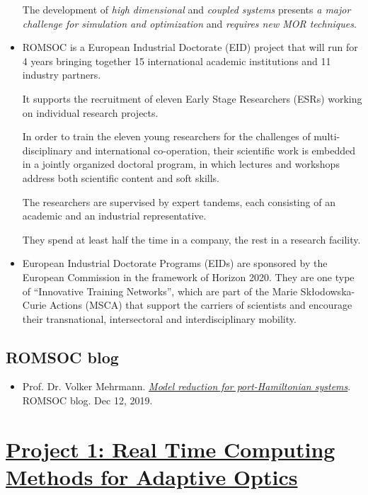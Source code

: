 \documentclass{book}
\numberwithin{equation}{section}
\begin{document}
\begin{itemize}
    The development of \textit{high dimensional} and \textit{coupled systems} presents \textit{a major challenge for simulation and optimization} and \textit{requires new MOR techniques}.
    \item ROMSOC is a European Industrial Doctorate (EID) project that will run for 4 years bringing together 15 international academic institutions and 11 industry partners.
    
    It supports the recruitment of eleven Early Stage Researchers (ESRs) working on individual research projects.
    
    In order to train the eleven young researchers for the challenges of multi-disciplinary and international co-operation, their scientific work is embedded in a jointly organized doctoral program, in which lectures and workshops address both scientific content and soft skills.
    
    The researchers are supervised by expert tandems, each consisting of an academic and an industrial representative.
    
    They spend at least half the time in a company, the rest in a research facility.
    \item European Industrial Doctorate Programs (EIDs) are sponsored by the European Commission in the framework of Horizon 2020. They are one type of ``Innovative Training Networks'', which are part of the Marie Skłodowska-Curie Actions (MSCA) that support the carriers of scientists and encourage their transnational, intersectoral and interdisciplinary mobility.
\end{itemize}

\section*{ROMSOC blog}
\begin{itemize}
    \item Prof. Dr. Volker Mehrmann. \href{https://www.romsoc.eu/model-reduction-for-port-hamiltonian-systems/}{\textit{Model reduction for port-Hamiltonian systems}}. ROMSOC blog. Dec 12, 2019.
\end{itemize}


\chapter{\href{https://www.romsoc.eu/projects/real-time-computing-methods-for-adaptive-optics/}{Project 1: Real Time Computing Methods for Adaptive Optics}}
\end{document}
